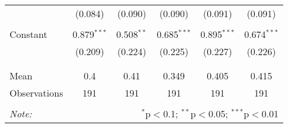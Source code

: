 \begin{tabular}{@{\extracolsep{5pt}}lccccc}
  & (0.084) & (0.090) & (0.090) & (0.091) & (0.091) \\ 
  & & & & & \\ 
 Constant & 0.879$^{***}$ & 0.508$^{**}$ & 0.685$^{***}$ & 0.895$^{***}$ & 0.674$^{***}$ \\ 
  & (0.209) & (0.224) & (0.225) & (0.227) & (0.226) \\ 
  & & & & & \\ 
\hline \\[-1.8ex] 
Mean & 0.4 & 0.41 & 0.349 & 0.405 & 0.415 \\ 
Observations & 191 & 191 & 191 & 191 & 191 \\ 
\hline 
\hline \\[-1.8ex] 
\textit{Note:}  & \multicolumn{5}{r}{$^{*}$p$<$0.1; $^{**}$p$<$0.05; $^{***}$p$<$0.01} \\ 
\end{tabular} 
